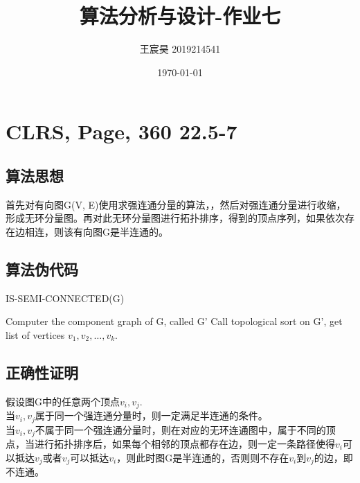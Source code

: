 \documentclass[UTF8]{ctexart}
\title{算法分析与设计-作业七}
\author{王宸昊 2019214541}
\date{\today}
\begin{document}
\maketitle


\section{CLRS, Page, 360 22.5-7}

\subsection{算法思想}

首先对有向图G(V, E)使用求强连通分量的算法，，然后对强连通分量进行收缩，形成无环分量图。再对此无环分量图进行拓扑排序，得到的顶点序列，如果依次存在边相连，则该有向图G是半连通的。

\subsection{算法伪代码}

\begin{algorithm}[H]
	\caption{IS-SEMI-CONNECTED(G)}  %
    \begin{algorithmic}[1]  %
        \STATE Computer the component graph of G, called G'
        \STATE Call topological sort on G', get list of vertices $v_1, v_2, \dots, v_k$.
        \ENDIF
        \ENDFOR
	\end{algorithmic}
\end{algorithm}

 \subsection{正确性证明}

 假设图G中的任意两个顶点$v_i, v_j$.\\
 当$v_i, v_j$属于同一个强连通分量时，则一定满足半连通的条件。\\
 当$v_i, v_j$不属于同一个强连通分量时，则在对应的无环连通图中，属于不同的顶点，当进行拓扑排序后，如果每个相邻的顶点都存在边，则一定一条路径使得$v_i$可以抵达$v_j$或者$v_j$可以抵达$v_i$，则此时图G是半连通的，否则则不存在$v_i$到$v_j$的边，即不连通。
\end{document}
